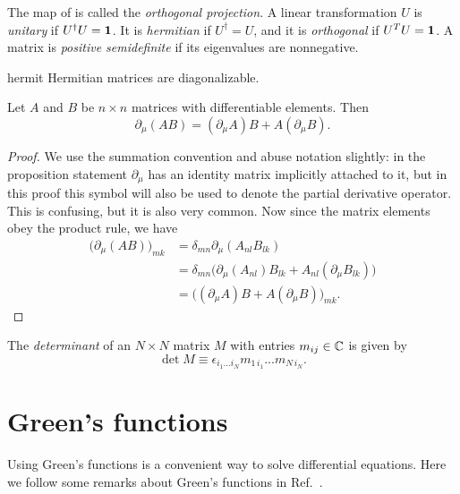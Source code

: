   The map of  is called the {\it orthogonal
  projection}.
  A linear transformation $U$ is {\it unitary} if $U^\dagger U={\mathbf 1}$.
  It is {\it hermitian} if $U^\dagger=U$, and it is {\it orthogonal}
  if $U^TU={\mathbf 1}$. A matrix is
  {\it positive semidefinite} if its eigenvalues are nonnegative.

\begin{theorem}{}{hermit}
  Hermitian matrices are diagonalizable.
\end{theorem}

\begin{proposition}{}{}
  Let $A$ and $B$ be $n\times n$ matrices with differentiable elements. Then
  $$
    \partial_\mu(AB)=(\partial_\mu A)B+A(\partial_\mu B).
  $$
  \begin{proof}
    We use the summation convention and abuse notation slightly: in the
    proposition statement $\partial_\mu$ has an identity matrix implicitly
    attached to it, but in this proof this symbol will also be used to
    denote the partial derivative operator. This is confusing, but
    it is also very common. Now since the matrix elements obey the product
    rule, we have
    \begin{equation*}
      \begin{aligned}
        \big(\partial_\mu(AB)\big)_{mk}
          &=\delta_{mn}\partial_\mu(A_{nl}B_{lk})\\
          &=\delta_{mn}\big(\partial_\mu(A_{nl})B_{lk}
                            +A_{nl}(\partial_\mu B_{lk})\big)\\
          &=\big((\partial_\mu A)B+A(\partial_\mu B)\big)_{mk}.
      \end{aligned}
    \end{equation*}
  \end{proof}
\end{proposition}

The {\it determinant} of an $N\times N$ matrix $M$
with entries $m_{ij}\in\mathbb{C}$ is given by
\begin{equation}
  \det M\equiv\epsilon_{i_1...i_N}m_{1\,i_1}...m_{N\,i_N}.
\end{equation}

\section{Green's functions}
Using Green's functions is a convenient way to solve differential equations.
Here we follow some remarks about Green's functions in
Ref.~\cite{mccomb_renormalization_2004}.


